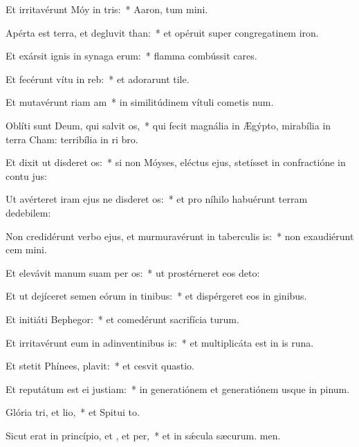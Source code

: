 \item Et irritavérunt Móy in tris:~* Aaron, tum mini.
\item Apérta est terra, et degluvit than:~* et opéruit super congregatinem iron.
\item Et exársit ignis in synaga erum:~* flamma combússit cares.
\item Et fecérunt vítu in reb:~* et adorarunt tile.
\item Et mutavérunt riam am~* in similitúdinem vítuli cometis num.
\item Oblíti sunt Deum, qui salvit os,~* qui fecit magnália in Ægýpto, mirabília in terra Cham: terribília in ri bro.
\item Et dixit ut disderet os:~* si non Móyses, eléctus ejus, stetísset in confractióne in contu jus:
\item Ut avérteret iram ejus ne disderet os:~* et pro níhilo habuérunt terram dedebilem:
\item Non credidérunt verbo ejus, et murmuravérunt in taberculis is:~* non exaudiérunt cem mini.
\item Et elevávit manum suam per os:~* ut prostérneret eos  deto:
\item Et ut dejíceret semen eórum in tinibus:~* et dispérgeret eos in ginibus.
\item Et initiáti  Bephegor:~* et comedérunt sacrifícia turum.
\item Et irritavérunt eum in adinventinibus is:~* et multiplicáta est in is runa.
\item Et stetit Phínees,  plavit:~* et cesvit quastio.
\item Et reputátum est ei  justiam:~* in generatiónem et generatiónem usque in pinum.
\item Glória tri, et lio,~* et Spitui to.
\item Sicut erat in princípio, et , et per,~* et in sǽcula sæcurum. men.
